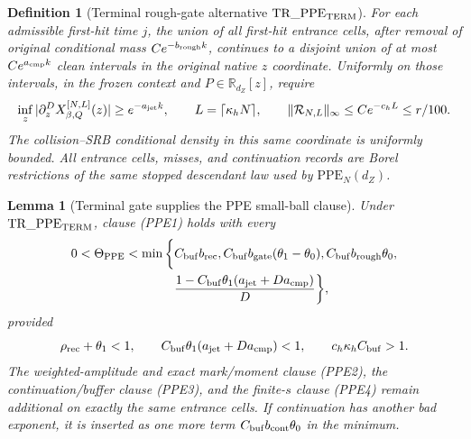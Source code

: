 \documentclass[11pt]{article}
\newtheorem{lemma}[theorem]{Lemma}
\newtheorem{definition}[theorem]{Definition}
\begin{document}
\begin{definition}[Terminal rough-gate alternative
$\mathrm{TR\_PPE}_{\rm TERM}$]
For each admissible first-hit time $j$, the union of all first-hit entrance
cells, after removal of original conditional mass
$Ce^{-b_{\rm rough}k}$, continues to a disjoint union of at most
$Ce^{a_{\rm cmp}k}$ clean intervals in the original native $z$ coordinate.
Uniformly on those intervals, in the
frozen context and
$P\in\mathbb R_{d_Z}[z]$, require
\begin{equation}
\label{eq:translation-terminal-jet}
 \inf_z|\partial_z^D X^{[N,L]}_{\beta,Q}(z)|
 \ge e^{-a_{\rm jet}k},\qquad
 L=\lceil\kappa_hN\rceil,\qquad
 \|\mathcal R_{N,L}\|_\infty\le Ce^{-c_hL}\le r/100.
\end{equation}
The collision--SRB conditional density in this same coordinate is uniformly
bounded.  All entrance cells, misses, and continuation records are Borel
restrictions of the same stopped descendant law used by
$\mathrm{PPE}_N(d_Z)$.
\end{definition}

\begin{lemma}[Terminal gate supplies the PPE small-ball clause]
\label{lem:translation-terminal-implies-ppe}
Under $\mathrm{TR\_PPE}_{\rm TERM}$, clause \textup{(PPE1)} holds with
every
\begin{equation}
\label{eq:translation-terminal-ppe-exponent}
\begin{split}
0<\Theta_{\rm PPE}<\min\bigg\{&C_{\rm buf}b_{\rm rec},
 C_{\rm buf}b_{\rm gate}(\theta_1-\theta_0),
 C_{\rm buf}b_{\rm rough}\theta_0,\\
 &\frac{1-C_{\rm buf}\theta_1
 (a_{\rm jet}+Da_{\rm cmp})}{D}\bigg\},
\end{split}
\end{equation}
provided
\begin{equation}
\label{eq:translation-terminal-positive-window}
 \rho_{\rm rec}+\theta_1<1,\qquad
 C_{\rm buf}\theta_1(a_{\rm jet}+Da_{\rm cmp})<1,
 \qquad c_h\kappa_hC_{\rm buf}>1.
\end{equation}
The weighted-amplitude and exact mark/moment clause \textup{(PPE2)}, the
continuation/buffer clause \textup{(PPE3)}, and the finite-$s$ clause
\textup{(PPE4)} remain additional on exactly the same entrance cells.  If
continuation has another bad exponent, it is inserted as one more
term $C_{\rm buf}b_{\rm cont}\theta_0$ in the minimum.
\end{lemma}
\end{document}
